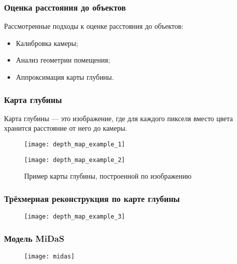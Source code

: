 \begin{frame}
    \frametitle{Оценка расстояния до объектов}
    Рассмотренные подходы к оценке расстояния до объектов:
    \begin{itemize}
        \item Калибровка камеры;
        \item Анализ геометрии помещения;
        \item Аппроксимация карты глубины.
    \end{itemize}
\end{frame}

\begin{frame}
    \frametitle{Карта глубины}
    \begin{definition}
        Карта глубины --- это изображение, где для каждого пикселя вместо цвета хранится расстояние от него до камеры.
    \end{definition}

    \begin{figure}
        \begin{minipage}[!h]{0.49\linewidth}
            \centering
            \texttt{[image: depth\_map\_example\_1]}
        \end{minipage}
        \hfill
        \begin{minipage}[!h]{0.49\linewidth}
            \centering
            \texttt{[image: depth\_map\_example\_2]}
        \end{minipage}
        \caption{Пример карты глубины, построенной по изображению}
    \end{figure}

\end{frame}

\begin{frame}
    \frametitle{Трёхмерная реконструкция по карте глубины}
    \begin{figure}
        \centering
        \texttt{[image: depth\_map\_example\_3]}
    \end{figure}
\end{frame}

\begin{frame}
    \frametitle{Модель MiDaS}
    \begin{figure}
        \centering
        \texttt{[image: midas]}
    \end{figure}
\end{frame}

